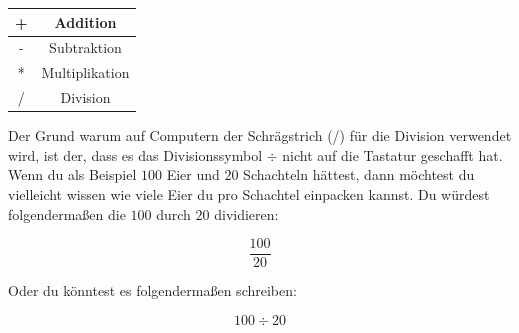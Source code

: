 \begin{center}
\begin{tabular}{|c|c|}
\hline
+ & Addition \\
\hline
- & Subtraktion \\
\hline
* & Multiplikation \\
\hline
/ & Division \\
\hline
\end{tabular}
\end{center}

Der Grund warum auf Computern der Schrägstrich (/) für die Division verwendet wird, ist der, dass es das Divisionssymbol $\div$ nicht auf die Tastatur geschafft hat. Wenn du als Beispiel $100$ Eier und $20$ Schachteln hättest, dann möchtest du vielleicht wissen wie viele Eier du pro Schachtel einpacken kannst. Du würdest folgendermaßen die $100$ durch $20$ dividieren:

\begin{displaymath}
\frac{100}{20}
\end{displaymath}



Oder du könntest es folgendermaßen schreiben:

\begin{displaymath}
100 \div 20
\end{displaymath}


